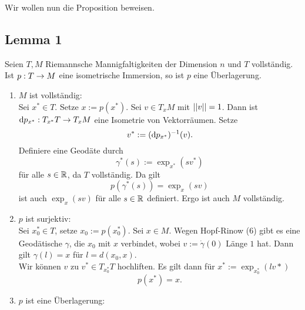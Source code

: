 Wir wollen nun die Proposition beweisen.

\subsection{Lemma 1}
Seien $T,M$ Riemannsche Mannigfaltigkeiten der Dimension $n$ und $T$ vollständig. Ist $p : T \overset{}{\rightarrow} M$ eine isometrische Immersion, so ist $p$ eine Überlagerung.
\begin{Beweis}{}
\begin{enumerate}[(1)]
	\item $M$ ist vollständig:\\
	Sei $x^* \in T$. Setze $x:= p(x^*)$. Sei $v \in T_xM$ mit $\left|\left|v\right|\right| = 1$. Dann ist $\text{d} p_{x^*} : T_{x^*}T \overset{}{\rightarrow} T_xM$ eine Isometrie von Vektorräumen. Setze
	\[ v^* := (\text{d} p_{x^*})^{-1} (v). \]
	Definiere eine Geodäte durch
	\[ \gamma^*(s) := \exp_{x^*}(sv^*) \]
	für alle $s \in \mathbb{R}$, da $T$ vollständig. Da gilt
	\[ p(\gamma^*(s)) = \exp_{x}(sv) \]
	ist auch $\exp_{x}(sv)$ für alle $s \in \mathbb{R}$ definiert. Ergo ist auch $M$ vollständig.
	\item $p$ ist surjektiv:\\
	Sei $x_0^* \in T$, setze $x_0:= p(x_0^*)$. Sei $x \in M$. Wegen Hopf-Rinow (6) gibt es eine Geodätische $\gamma$, die $x_0$ mit $x$ verbindet, wobei $v := \dot{\gamma}(0)$ Länge $1$ hat. Dann gilt $\gamma(l) = x$ für $l = d(x_0,x)$.\\
	Wir können $v$ zu $v^* \in T_{x_0^*}T$ hochliften. Es gilt dann für $x^* := \exp_{x_0^*}(lv*)$
	\[ p(x^*) = x. \]
	\item $p$ ist eine Überlagerung:\\
	
\end{enumerate}
\end{Beweis}